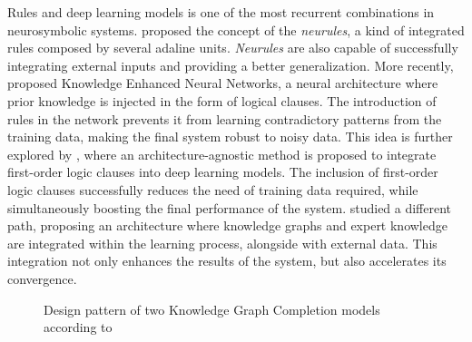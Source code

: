 Rules and deep learning models is one of the most recurrent combinations in neurosymbolic systems. \cite{hatzilygeroudis_integrated_2010} proposed the concept of the \textit{neurules}, a kind of integrated rules composed by several adaline units. \textit{Neurules} are also capable of successfully integrating external inputs and providing a better generalization. More recently, \cite{daniele_knowledge_2019} proposed Knowledge Enhanced Neural Networks, a neural architecture where prior knowledge is injected in the form of logical clauses. The introduction of rules in the network prevents it from learning contradictory patterns from the training data, making the final system robust to noisy data. This idea is further explored by \cite{roychowdhury_regularizing_2021}, where an architecture-agnostic method is proposed to integrate first-order logic clauses into deep learning models. The inclusion of first-order logic clauses successfully reduces the need of training data required, while simultaneously boosting the final performance of the system. \cite{kursuncu_knowledge_2020} studied a different path, proposing an architecture where knowledge graphs and expert knowledge are integrated within the learning process, alongside with external data. This integration not only enhances the results of the system, but also accelerates its convergence.

\begin{figure}[t!]
    \centering
    \caption{Design pattern of two Knowledge Graph Completion models according to \cite{van_bekkum_modular_2021}}
    \label{fig:van_bekkum_kgc}
\end{figure}

